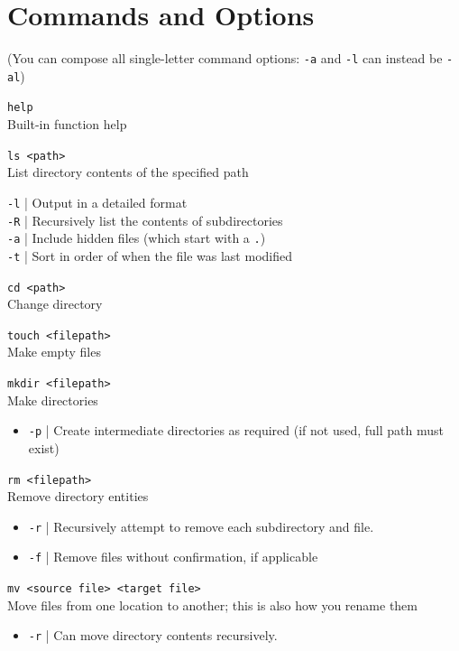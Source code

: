 \documentclass[a4paper,11pt,parskip=half-]{scrartcl}
\begin{document}
\newpage

\section*{Commands and Options}

(You can compose all single-letter command options: \texttt{-a} and \texttt{-l} can instead be \texttt{-al})

\Large \texttt{help} \normalsize \\
Built-in function help

\Large \texttt{ls <path>} \normalsize \\
List directory contents of the specified path

\qquad \texttt{-l} | Output in a detailed format \\
\qquad \texttt{-R} | Recursively list the contents of subdirectories \\
\qquad \texttt{-a} | Include hidden files (which start with a \texttt{.}) \\
\qquad \texttt{-t} | Sort in order of when the file was last modified

\Large \texttt{cd <path>} \normalsize \\
Change directory

\Large \texttt{touch <filepath>} \normalsize \\
Make empty files

\Large \texttt{mkdir <filepath>} \normalsize \\
Make directories
\begin{itemize}
    \item \texttt{-p} | Create intermediate directories as required (if not used, full path must exist)
\end{itemize}

\Large \texttt{rm <filepath>} \normalsize \\
Remove directory entities
\begin{itemize}
    \item \texttt{-r} | Recursively attempt to remove each subdirectory and file.
    \item \texttt{-f} | Remove files without confirmation, if applicable
\end{itemize}

\Large \texttt{mv <source file> <target file>} \normalsize \\
Move files from one location to another; this is also how you rename them
\begin{itemize}
    \item \texttt{-r} | Can move directory contents recursively.
\end{itemize}
\end{document}
